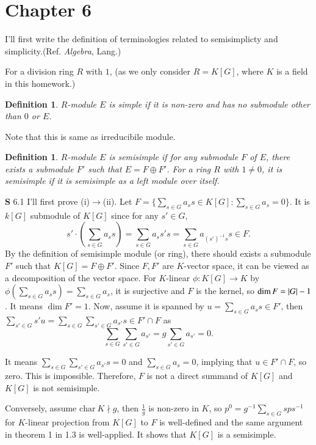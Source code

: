 \documentclass[a4paper, 12pt]{article}
\theoremstyle{Mydefinition}
\newtheorem{definition}[statement]{Definition}
\theoremstyle{Mytheorem}
\begin{document}
\newpage
\section{Chapter 6}

I'll first write the definition of terminologies related to semisimplicty and simplicity.(Ref. \textit{Algebra}, Lang.)

For a division ring $R$ with $1$, (as we only consider $R=K[G]$, where $K$ is a field in this homework.)
\begin{definition}
$R$-module $E$ is simple if it is non-zero and has no submodule other than $0$ or $E$.
\end{definition}
Note that this is same as irreducibile module.
\begin{definition}
$R$-module $E$ is semisimple if for any submodule $F$ of $E$, there exists a submodule $F'$ such that $E=F\oplus F'$. For a ring $R$ with $1\neq 0$, it is semisimple if it is semisimple as a left module over itself.
\end{definition}

\noindent \textbf{S} 6.1
I'll first prove (i)$\rightarrow$(ii). Let $F = \{\sum_{s\in G}a_s s\in K[G]:\sum_{s\in G}a_s = 0\}$. It is $k[G]$ submodule of $K[G]$ since for any $s'\in G$,
\begin{equation}
    s'\cdot \left(\sum_{s\in G}a_s s\right) = \sum_{s\in G}a_s s's = \sum_{s\in G}a_{(s')^{-1}s} s \in F.
\end{equation}
By the definition of semisimple module (or ring), there should exists a submodule $F'$ such that $K[G]=F\oplus F'$. Since $F,F'$ are $K$-vector space, it can be viewed as a decomposition of the vector space. For $K$-linear $\phi:K[G]\rightarrow K$ by $\phi(\sum_{s\in G}a_s s) = \sum_{s\in G}a_s$, it is surjective and $F$ is the kernel, so $\dim F = \abs{G}-1$. It means $\dim F' = 1$. Now, assume it is spanned by $u = \sum_{s\in G}a_s s\in F'$, then $\sum_{s'\in G}s'u = \sum_{s\in G}\sum_{s'\in G}a_{s'} s\in F'\cap F$ as 
\begin{equation}
    \sum_{s\in G}\sum_{s'\in G}a_{s'} = g\sum_{s'\in G}a_{s'} = 0.
\end{equation}

It means $\sum_{s\in G}\sum_{s'\in G}a_{s'} s = 0$ and $\sum_{s\in G}a_{s} = 0$, implying that $u\in F'\cap F$, so zero. This is impossible. Therefore, $F$ is not a direct summand of $K[G]$ and $K[G]$ is not semisimple.

Conversely, assume $\mathrm{char}~K\nmid g$, then $\frac{1}{g}$ is non-zero in $K$, so $p^0 = g^{-1}\sum_{s\in G}sps^{-1}$ for $K$-linear projection from $K[G]$ to $F$ is well-defined and the same argument in theorem 1 in 1.3 is well-applied. It shows that $K[G]$ is a semisimple.\\
\end{document}
